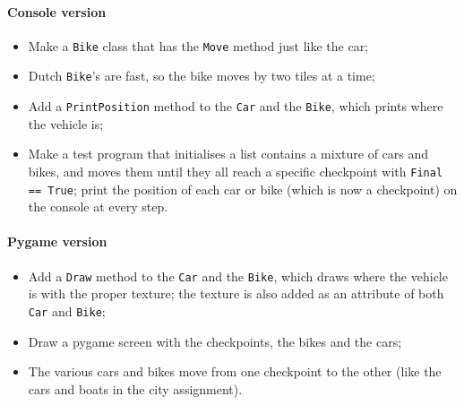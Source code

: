         \paragraph*{Console version}
        \begin{itemize}
            \item Make a \texttt{Bike} class that has the \texttt{Move} method just like the car;
            \item Dutch \texttt{Bike}'s are fast, so the bike moves by two tiles at a time;
            \item Add a \texttt{PrintPosition} method to the \texttt{Car} and the \texttt{Bike}, which prints where the vehicle is;
            \item Make a test program that initialises a list contains a mixture of cars and bikes, and moves them until they all reach a specific checkpoint with \texttt{Final == True}; print the position of each car or bike (which is now a checkpoint) on the console at every step.
        \end{itemize}

        \paragraph*{Pygame version}
        \begin{itemize}
            \item Add a \texttt{Draw} method to the \texttt{Car} and the \texttt{Bike}, which draws where the vehicle is with the proper texture; the texture is also added as an attribute of both \texttt{Car} and \texttt{Bike};
            \item Draw a pygame screen with the checkpoints, the bikes and the cars;
            \item The various cars and bikes move from one checkpoint to the other (like the cars and boats in the city assignment).
        \end{itemize}



